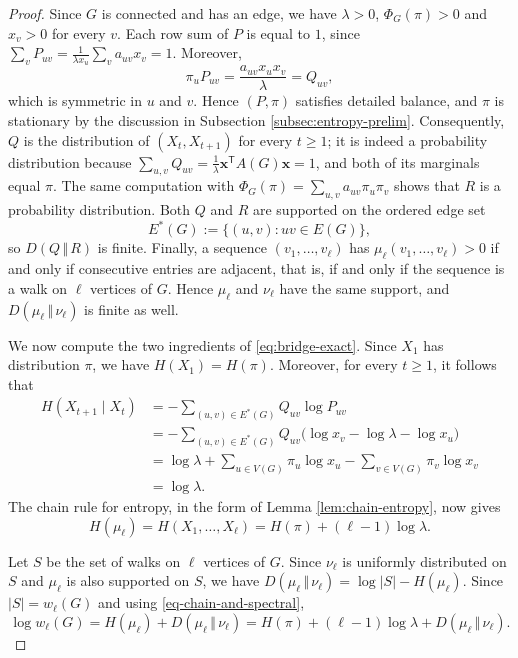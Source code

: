 \documentclass[11pt, a4paper]{article}
\theoremstyle{definition}
\theoremstyle{plain}
\renewcommand{\ge}{\geqslant}
\begin{document}
\begin{proof}
Since $G$ is connected and has an edge, we
have $\lambda >0$, $\Phi_G(\pi) >0$ and $x_v>0$ for every $v$. 
Each row sum of $P$ is equal to $1$, since 
$ \sum_{v} P_{uv} = 
\frac{1}{\lambda x_u} \sum_{v} a_{uv}x_v= 1.$ 
 Moreover,
\[
  \pi_uP_{uv}=\frac{a_{uv}x_ux_v}{\lambda}=Q_{uv},
\]
which is symmetric in $u$ and $v$. Hence $(P,\pi )$
satisfies detailed balance, and $\pi$ is stationary by
the discussion in Subsection
\ref{subsec:entropy-prelim}. Consequently,
 $Q$ is the distribution of $(X_t,X_{t+1})$ for every $t\ge 1$; it is indeed a probability distribution because
$\sum_{u,v}Q_{uv}=\frac1\lambda \bm{x}^{\mathsf T}A(G)
\bm{x}=1$, and both of its marginals equal $\pi$. The
same computation with $\Phi_G(\pi )=\sum_{u,v}a_{uv}
\pi_u\pi_v$ shows that $R$ is a probability
distribution. Both $Q$ and $R$ are supported on the
ordered edge set
$$E^{*}(G):=\{(u,v):uv\in E(G)\},$$
 so $D(Q\, \Vert\, R)$ is
finite. Finally, a sequence $(v_1,\ldots ,v_\ell )$ has
$\mu_\ell (v_1,\ldots ,v_\ell )>0$ if and only if
consecutive entries are adjacent, that is, if and only
if the sequence is a walk on $\ell$ vertices of $G$.
Hence $\mu_\ell$ and $\nu_\ell$ have the same support,
and $D(\mu_\ell \,\Vert \, \nu_\ell )$ is finite as well. 

We now compute the two ingredients of
\eqref{eq:bridge-exact}. Since $X_1$ has distribution
$\pi$, we have $H(X_1)=H(\pi )$. 
Moreover, for every $t\ge 1$, it follows that  
\begin{align*}
  H(X_{t+1}\mid X_t)
  &=-\sum_{(u,v)\in  E^* (G)}Q_{uv}\log P_{uv}\\
  &=-\sum_{(u,v)\in E^* (G)}Q_{uv}
       \bigl(\log x_v-\log\lambda-\log x_u\bigr)\\
  &=\log\lambda
    +\sum_{u\in V(G)}\pi_u\log x_u
    -\sum_{v\in V(G)} \pi_v\log x_v\\
  &=\log \lambda.
\end{align*} 
The chain rule for entropy, in the form of Lemma \ref{lem:chain-entropy}, now gives 
\begin{equation}  \label{eq-chain-and-spectral}
  H(\mu_{\ell}) = H(X_1,\ldots,X_\ell)
  =H(\pi)+(\ell-1)\log\lambda.
\end{equation}

\smallskip
Let $S$ be the set of walks on $\ell$ vertices of $G$. 
Since $\nu_{\ell}$ is uniformly distributed on $S$ and $\mu_{\ell}$ is also supported on $S$, we have 
$D(\mu_{\ell} \,\Vert\, \nu_{\ell} )=\log |S|-H(\mu_{\ell} )$. Since $|S|=w_\ell (G)$  and using  \eqref{eq-chain-and-spectral},
\begin{equation}\label{eq:step3}
  \log w_\ell (G)
  =H(\mu_\ell )+D(\mu_\ell \, \Vert \, \nu_\ell )
  =H(\pi )+(\ell -1)\log \lambda
   +D(\mu_\ell \, \Vert\,  \nu_\ell ).
\end{equation}


\end{proof}
\end{document}

